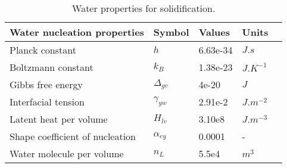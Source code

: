 \begin{table}[h!]
	\begin{tabular}{@{}lllll@{}}
		\toprule[1pt]
		\textbf{Water nucleation properties} & \textbf{Symbol} & \textbf{Values} & \textbf{Units} &  \\ \midrule[2pt]
		Planck constant & $h$ & 6.63e-34 & $J.s$ \\
		Boltzmann constant & $k_{B}$ & 1.38e-23 & $J.K^{-1}$ \\		
		Gibbs free energy & $\Delta_{gv}$ & 4e-20 & $J$ \\
		Interfacial tension & $\gamma_{yw}$ & 2.91e-2 & $J.m^{-2}$ \\		
		Latent heat per volume & $H_{lv}$ & 3.10e8 & $J.m^{-3}$ \\
		Shape coefficient of nucleation & $\alpha_{ey}$ & 0.0001 & - \\		
		Water molecule per volume & $n_{L}$ &  5.5e4  & $m^{3}$ \\		 \bottomrule[1pt]		
	\end{tabular}
	\centering
	\caption{Water properties for solidification.}	
	\label{fig:waterProperties}
\end{table}


